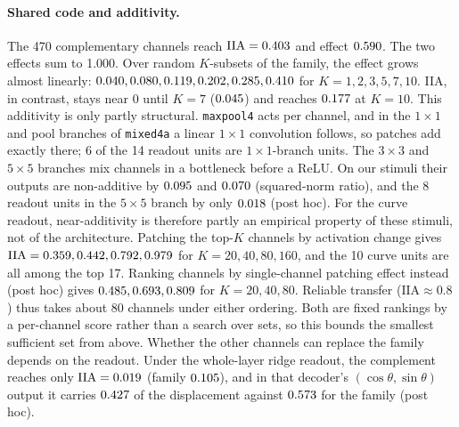 \documentclass[11pt]{article}
\newcommand{\iia}{\mathrm{IIA}}
\begin{document}
\paragraph{Shared code and additivity.}
The 470 complementary channels reach $\iia=\HOneCompl$ and effect $0.590$. The two effects sum to 1.000. Over random $K$-subsets of the family, the effect grows almost linearly: $0.040,0.080,0.119,0.202,0.285,0.410$ for $K=1,2,3,5,7,10$. IIA, in contrast, stays near 0 until $K=7$ ($0.045$) and reaches $0.177$ at $K=10$. This additivity is only partly structural. \texttt{maxpool4} acts per channel, and in the $1\times1$ and pool branches of \texttt{mixed4a} a linear $1\times1$ convolution follows, so patches add exactly there; 6 of the 14 readout units are $1\times1$-branch units. The $3\times3$ and $5\times5$ branches mix channels in a bottleneck before a ReLU. On our stimuli their outputs are non-additive by $0.095$ and $0.070$ (squared-norm ratio), and the 8 readout units in the $5\times5$ branch by only $0.018$ (post hoc). For the curve readout, near-additivity is therefore partly an empirical property of these stimuli, not of the architecture. Patching the top-$K$ channels by activation change gives $\iia=\TopKTwenty,\TopKForty,\TopKEighty,\TopKOneSixty$ for $K=20,40,80,160$, and the 10 curve units are all among the top 17. Ranking channels by single-channel patching effect instead (post hoc) gives $0.485,0.693,0.809$ for $K=20,40,80$. Reliable transfer ($\iia\approx0.8$) thus takes about 80 channels under either ordering. Both are fixed rankings by a per-channel score rather than a search over sets, so this bounds the smallest sufficient set from above. Whether the other channels can replace the family depends on the readout. Under the whole-layer ridge readout, the complement reaches only $\iia=\HRidgeCompl$ (family $0.105$), and in that decoder's $(\cos\theta,\sin\theta)$ output it carries $0.427$ of the displacement against $0.573$ for the family (post hoc).
\end{document}
